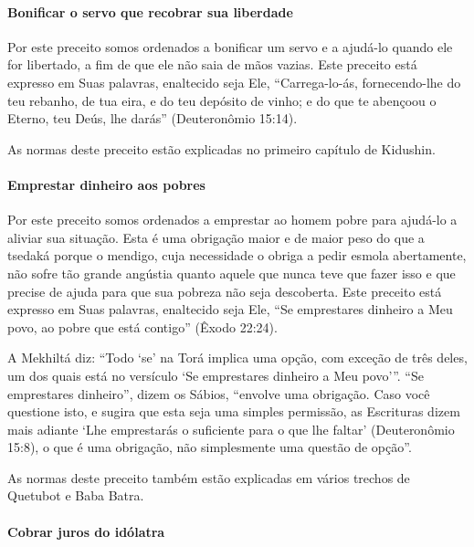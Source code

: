 \paragraph{Bonificar o servo que recobrar sua liberdade}

Por este preceito somos ordenados a bonificar um servo e a ajudá-lo
quando ele for libertado, a fim de que ele não saia de mãos vazias. Este
preceito está expresso em Suas palavras, enaltecido seja Ele,
``Carrega-lo-ás, fornecendo-lhe do teu rebanho, de tua eira, e do teu
depósito de vinho; e do que te abençoou o Eterno, teu Deús, lhe darás'' (Deuteronômio 15:14).

As normas deste preceito estão explicadas no primeiro capítulo de Kidushin.

\paragraph{Emprestar dinheiro aos pobres}

Por este preceito somos ordenados a emprestar ao homem pobre para
ajudá-lo a aliviar sua situação. Esta é uma obrigação maior e de maior
peso do que a tsedaká porque o mendigo, cuja necessidade o obriga a
pedir esmola abertamente, não sofre tão grande angústia quanto aquele
que nunca teve que fazer isso e que precise de ajuda para que sua
pobreza não seja descoberta. Este preceito está expresso em Suas
palavras, enaltecido seja Ele, ``Se emprestares dinheiro a Meu povo, ao
pobre que está contigo'' (Êxodo 22:24).

A Mekhiltá diz: ``Todo `se' na Torá implica uma opção, com exceção de
três deles, um dos quais está no versículo `Se emprestares dinheiro a
Meu povo'''. ``Se emprestares dinheiro'', dizem os Sábios, ``envolve uma
obrigação. Caso você questione isto, e sugira que esta seja uma simples
permissão, as Escrituras dizem mais adiante `Lhe emprestarás o
suficiente para o que lhe faltar' (Deuteronômio 15:8), o que é uma
obrigação, não simplesmente uma questão de opção''.

As normas deste preceito também estão explicadas em vários trechos de
Quetubot e Baba Batra.

\paragraph{Cobrar juros do idólatra}

